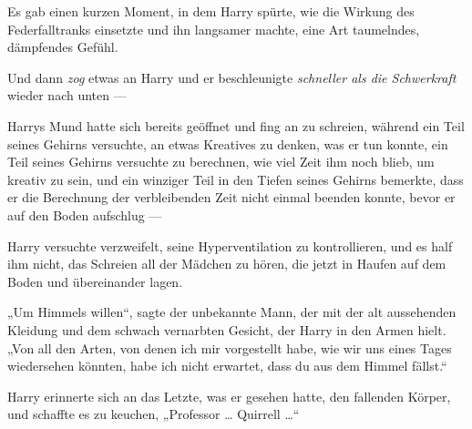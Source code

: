Es gab einen kurzen Moment, in dem Harry spürte, wie die Wirkung des Federfalltranks einsetzte und ihn langsamer machte, eine Art taumelndes, dämpfendes Gefühl.

Und dann \emph{zog} etwas an Harry und er beschleunigte \emph{schneller als die Schwerkraft} wieder nach unten —

Harrys Mund hatte sich bereits geöffnet und fing an zu schreien, während ein Teil seines Gehirns versuchte, an etwas Kreatives zu denken, was er tun konnte, ein Teil seines Gehirns versuchte zu berechnen, wie viel Zeit ihm noch blieb, um kreativ zu sein, und ein winziger Teil in den Tiefen seines Gehirns bemerkte, dass er die Berechnung der verbleibenden Zeit nicht einmal beenden konnte, bevor er auf den Boden aufschlug —

\later

Harry versuchte verzweifelt, seine Hyperventilation zu kontrollieren, und es half ihm nicht, das Schreien all der Mädchen zu hören, die jetzt in Haufen auf dem Boden und übereinander lagen.

„Um Himmels willen“, sagte der unbekannte Mann, der mit der alt aussehenden Kleidung und dem schwach vernarbten Gesicht, der Harry in den Armen hielt.
„Von all den Arten, von denen ich mir vorgestellt habe, wie wir uns eines Tages wiedersehen könnten, habe ich nicht erwartet, dass du aus dem Himmel fällst.“

Harry erinnerte sich an das Letzte, was er gesehen hatte, den fallenden Körper, und schaffte es zu keuchen,
„Professor … Quirrell …“

